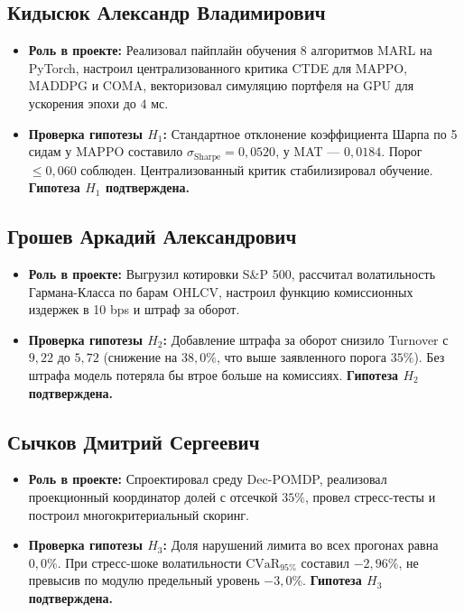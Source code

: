 \documentclass[11pt,a4paper]{article}
\begin{document}
\subsection{Кидысюк Александр Владимирович}
\begin{itemize}[leftmargin=*]
\item \textbf{Роль в проекте:} Реализовал пайплайн обучения 8 алгоритмов MARL на PyTorch, настроил централизованного критика CTDE для MAPPO, MADDPG и COMA, векторизовал симуляцию портфеля на GPU для ускорения эпохи до $4$ мс.
\item \textbf{Проверка гипотезы $H_1$:} Стандартное отклонение коэффициента Шарпа по 5 сидам у MAPPO составило $\sigma_{\text{Sharpe}} = 0{,}0520$, у MAT --- $0{,}0184$. Порог $\le 0{,}060$ соблюден. Централизованный критик стабилизировал обучение. \textbf{Гипотеза $H_1$ подтверждена.}
\end{itemize}

\subsection{Грошев Аркадий Александрович}
\begin{itemize}[leftmargin=*]
\item \textbf{Роль в проекте:} Выгрузил котировки S\&P 500, рассчитал волатильность Гармана-Класса по барам OHLCV, настроил функцию комиссионных издержек в 10 bps и штраф за оборот.
\item \textbf{Проверка гипотезы $H_2$:} Добавление штрафа за оборот снизило Turnover с $9{,}22$ до $5{,}72$ (снижение на $38{,}0\%$, что выше заявленного порога $35\%$). Без штрафа модель потеряла бы втрое больше на комиссиях. \textbf{Гипотеза $H_2$ подтверждена.}
\end{itemize}

\subsection{Сычков Дмитрий Сергеевич}
\begin{itemize}[leftmargin=*]
\item \textbf{Роль в проекте:} Спроектировал среду Dec-POMDP, реализовал проекционный координатор долей с отсечкой $35\%$, провел стресс-тесты и построил многокритериальный скоринг.
\item \textbf{Проверка гипотезы $H_3$:} Доля нарушений лимита во всех прогонах равна $0{,}0\%$. При стресс-шоке волатильности $\text{CVaR}_{95\%}$ составил $-2{,}96\%$, не превысив по модулю предельный уровень $-3{,}0\%$. \textbf{Гипотеза $H_3$ подтверждена.}
\end{itemize}
\end{document}
